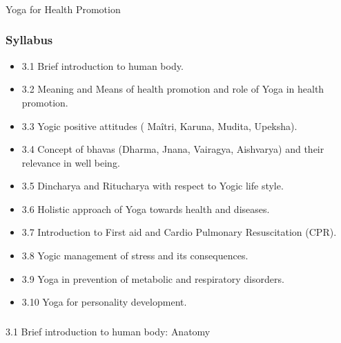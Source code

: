 \begin{frame}[fragile]\frametitle{}
\begin{center}
{\Large Yoga for Health Promotion }
\end{center}
\end{frame}


\begin{frame}[fragile]\frametitle{Syllabus}

\begin{itemize}
\item 3.1  Brief introduction to human body. 
\item 3.2  Meaning and Means of health promotion and role of Yoga  in health promotion. 
\item 3.3  Yogic positive attitudes ( Maîtri, Karuna, Mudita, Upeksha). 
\item 3.4  Concept of bhavas (Dharma, Jnana, Vairagya, Aishvarya) and their relevance in well being. 
\item 3.5  Dincharya and Ritucharya with respect to Yogic life style. 
\item 3.6  Holistic approach of Yoga towards health and diseases. 
\item 3.7  Introduction to First aid and Cardio Pulmonary Resuscitation (CPR). 
\item 3.8  Yogic management of stress and its consequences. 
\item 3.9  Yoga in prevention of metabolic and respiratory disorders. 
\item 3.10  Yoga for personality development. 
\end{itemize}
	  
\end{frame}

\begin{frame}[fragile]\frametitle{}
\begin{center}
{\Large 3.1  Brief introduction to human body: Anatomy}
\end{center}
\end{frame}



